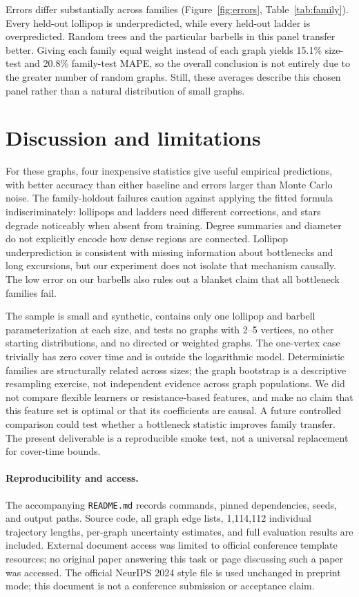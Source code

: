 \documentclass{article}
\begin{document}
Errors differ substantially across families (Figure~\ref{fig:errors}, Table~\ref{tab:family}). Every held-out lollipop is underpredicted, while every held-out ladder is overpredicted. Random trees and the particular barbells in this panel transfer better. Giving each family equal weight instead of each graph yields 15.1\% size-test and 20.8\% family-test MAPE, so the overall conclusion is not entirely due to the greater number of random graphs. Still, these averages describe this chosen panel rather than a natural distribution of small graphs.

\section{Discussion and limitations}
For these graphs, four inexpensive statistics give useful empirical predictions, with better accuracy than either baseline and errors larger than Monte Carlo noise. The family-holdout failures caution against applying the fitted formula indiscriminately: lollipops and ladders need different corrections, and stars degrade noticeably when absent from training. Degree summaries and diameter do not explicitly encode how dense regions are connected. Lollipop underprediction is consistent with missing information about bottlenecks and long excursions, but our experiment does not isolate that mechanism causally. The low error on our barbells also rules out a blanket claim that all bottleneck families fail.

The sample is small and synthetic, contains only one lollipop and barbell parameterization at each size, and tests no graphs with 2--5 vertices, no other starting distributions, and no directed or weighted graphs. The one-vertex case trivially has zero cover time and is outside the logarithmic model. Deterministic families are structurally related across sizes; the graph bootstrap is a descriptive resampling exercise, not independent evidence across graph populations. We did not compare flexible learners or resistance-based features, and make no claim that this feature set is optimal or that its coefficients are causal. A future controlled comparison could test whether a bottleneck statistic improves family transfer. The present deliverable is a reproducible smoke test, not a universal replacement for cover-time bounds.

\paragraph{Reproducibility and access.}
The accompanying \texttt{README.md} records commands, pinned dependencies, seeds, and output paths. Source code, all graph edge lists, 1,114,112 individual trajectory lengths, per-graph uncertainty estimates, and full evaluation results are included. External document access was limited to official conference template resources; no original paper answering this task or page discussing such a paper was accessed. The official NeurIPS 2024 style file is used unchanged in preprint mode; this document is not a conference submission or acceptance claim.



\end{document}
